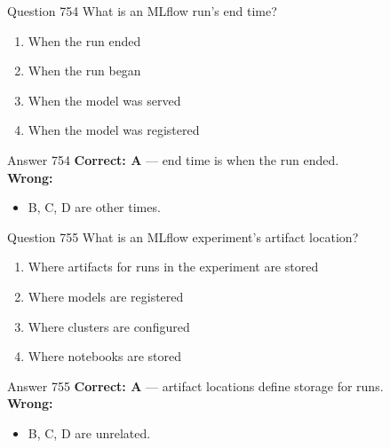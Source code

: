 \documentclass[aspectratio=169,11pt]{beamer}
\begin{document}
	\begin{frame}{Question 754}
		What is an MLflow run's end time?
		\begin{enumerate}[label=\Alph*.]
			\item When the run ended
			\item When the run began
			\item When the model was served
			\item When the model was registered
		\end{enumerate}
	\end{frame}
	\begin{frame}{Answer 754}
		\textbf{Correct: A} --- end time is when the run ended.\\
		\vspace{0.5em}
		\textbf{Wrong:}
		\begin{itemize}
			\item B, C, D are other times.
		\end{itemize}
	\end{frame}
	
	\begin{frame}{Question 755}
		What is an MLflow experiment's artifact location?
		\begin{enumerate}[label=\Alph*.]
			\item Where artifacts for runs in the experiment are stored
			\item Where models are registered
			\item Where clusters are configured
			\item Where notebooks are stored
		\end{enumerate}
	\end{frame}
	\begin{frame}{Answer 755}
		\textbf{Correct: A} --- artifact locations define storage for runs.\\
		\vspace{0.5em}
		\textbf{Wrong:}
		\begin{itemize}
			\item B, C, D are unrelated.
		\end{itemize}
	\end{frame}
	
\end{document}
